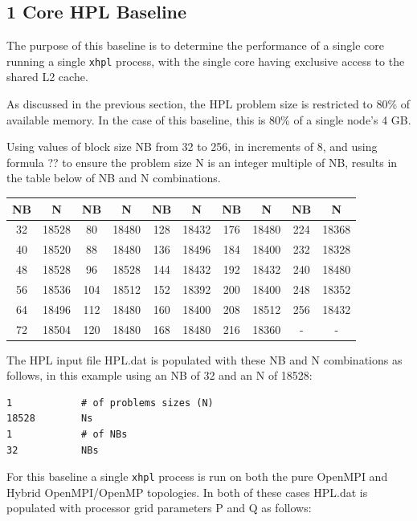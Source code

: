 \documentclass{report}
\begin{document}
%
%
\subsection{1 Core HPL Baseline}

The purpose of this baseline is to determine the performance of a single core running a single \verb|xhpl| process, with the single core having exclusive access to the shared L2 cache. 

As discussed in the previous section, the HPL problem size is restricted to 80\% of available memory. In the case of this baseline, this is 80\% of a single node's 4 GB.

Using values of block size NB from 32 to 256, in increments of 8, and using formula ?? to ensure the problem size N is an integer multiple of NB, results in the table below of NB and N combinations.

\begin{center}
	\begin{tabular}{ |c|c|c|c|c|c|c|c|c|c| } 
		\hline
		NB & N & NB & N & NB & N & NB & N & NB & N \\ 
		\hline
		32 & 18528 &  80 & 18480 & 128 & 18432 & 176 & 18480 & 224 & 18368 \\ 
		40 & 18520 &  88 & 18480 & 136 & 18496 & 184 & 18400 & 232 & 18328 \\ 
 		48 & 18528 &  96 & 18528 & 144 & 18432 & 192 & 18432 & 240 & 18480 \\
		56 & 18536 & 104 & 18512 & 152 & 18392 & 200 & 18400 & 248 & 18352 \\ 
 		64 & 18496 & 112 & 18480 & 160 & 18400 & 208 & 18512 & 256 & 18432 \\
		72 & 18504 & 120 & 18480 & 168 & 18480 & 216 & 18360 &   - &     - \\ 
 		\hline
	\end{tabular}
\end{center}

The HPL input file HPL.dat is populated with these NB and N combinations as follows, in this example using an NB of 32 and an N of 18528: 

\lstset{style=listing}
\begin{lstlisting}[numbers=none]
1            # of problems sizes (N)
18528        Ns
1            # of NBs
32           NBs
\end{lstlisting}

For this baseline a single \verb|xhpl| process is run on both the pure OpenMPI and Hybrid OpenMPI/OpenMP topologies. In both of these cases HPL.dat is populated with processor grid parameters P and Q as follows:
\end{document}
